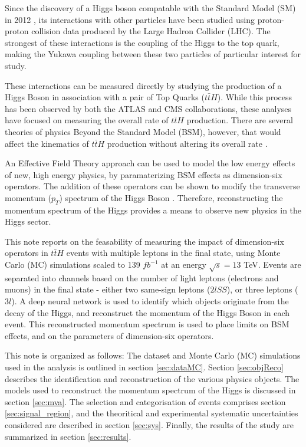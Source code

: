 Since the discovery of a Higgs boson compatable with the Standard Model (SM) in 2012 \cite{HION-2010-02}, its interactions with other particles have been studied using proton-proton collision data produced by the Large Hadron Collider (LHC). The strongest of these interactions is the coupling of the Higgs to the top quark, making the Yukawa coupling between these two particles of particular interest for study.

These interactions can be measured directly by studying the production of a Higgs Boson in association with a pair of Top Quarks ($t\bar{t}H$). While this process has been observed by both the ATLAS and CMS collaborations, these analyses have focused on measuring the overall rate of $t\bar{t}H$ production. There are several theories of physics Beyond the Standard Model (BSM), however, that would affect the kinematics of $t\bar{t}H$ production without altering its overall rate \cite{Dumont_2013}.  

An Effective Field Theory approach can be used to model the low energy effects of new, high energy physics, by paramaterizing BSM effects as dimension-six operators. The addition of these operators can be shown to modify the transverse momentum ($p_T$) spectrum of the Higgs Boson \cite{Banerjee_2014}. Therefore, reconstructing the momentum spectrum of the Higgs provides a means to observe new physics in the Higgs sector.  

This note reports on the feasability of measuring the impact of dimension-six operators in $t\bar{t}H$ events with multiple leptons in the final state, using Monte Carlo (MC) simulations scaled to 139 $fb^{-1}$ at an energy $\sqrt{s} = 13$ TeV. Events are separated into channels based on the number of light leptons (electrons and muons) in the final state - either two same-sign leptons ($2lSS$), or three leptons ($3l$). A deep neural network is used to identify which objects originate from the decay of the Higgs, and reconstruct the momentum of the Higgs Boson in each event. This reconstructed momentum spectrum is used to place limits on BSM effects, and on the parameters of dimension-six operators.

This note is organized as follows: The dataset and Monte Carlo (MC) simulations used in the analysis is outlined in section \ref{sec:dataMC}. Section \ref{sec:objReco} describes the identification and reconstruction of the various physics objects. The models used to reconstruct the momentum spectrum of the Higgs is discussed in section \ref{sec:mva}. The selection and categorisation of events comprises section \ref{sec:signal_region}, and the theoritical and experimental systematic uncertainties considered are described in section \ref{sec:sys}. Finally, the results of the study are summarized in section \ref{sec:results}.
